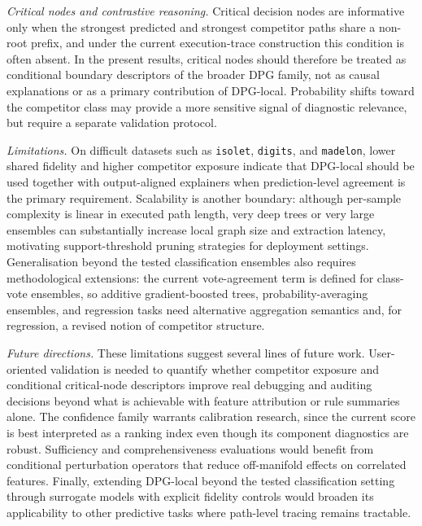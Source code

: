 \documentclass[runningheads]{llncs}
\begin{document}
\emph{Critical nodes and contrastive reasoning.} Critical decision nodes are informative only when the strongest predicted and strongest competitor paths share a non-root prefix, and under the current execution-trace construction this condition is often absent. In the present results, critical nodes should therefore be treated as conditional boundary descriptors of the broader DPG family, not as causal explanations or as a primary contribution of DPG-local. Probability shifts toward the competitor class may provide a more sensitive signal of diagnostic relevance, but require a separate validation protocol.

\emph{Limitations.} On difficult datasets such as \texttt{isolet}, \texttt{digits}, and \texttt{madelon}, lower shared fidelity and higher competitor exposure indicate that DPG-local should be used together with output-aligned explainers when prediction-level agreement is the primary requirement. Scalability is another boundary: although per-sample complexity is linear in executed path length, very deep trees or very large ensembles can substantially increase local graph size and extraction latency, motivating support-threshold pruning strategies for deployment settings. Generalisation beyond the tested classification ensembles also requires methodological extensions: the current vote-agreement term is defined for class-vote ensembles, so additive gradient-boosted trees, probability-averaging ensembles, and regression tasks need alternative aggregation semantics and, for regression, a revised notion of competitor structure.

\emph{Future directions.} These limitations suggest several lines of future work. User-oriented validation is needed to quantify whether competitor exposure and conditional critical-node descriptors improve real debugging and auditing decisions beyond what is achievable with feature attribution or rule summaries alone. The confidence family warrants calibration research, since the current score is best interpreted as a ranking index even though its component diagnostics are robust. Sufficiency and comprehensiveness evaluations would benefit from conditional perturbation operators that reduce off-manifold effects on correlated features. Finally, extending DPG-local beyond the tested classification setting through surrogate models with explicit fidelity controls would broaden its applicability to other predictive tasks where path-level tracing remains tractable.


\end{document}
